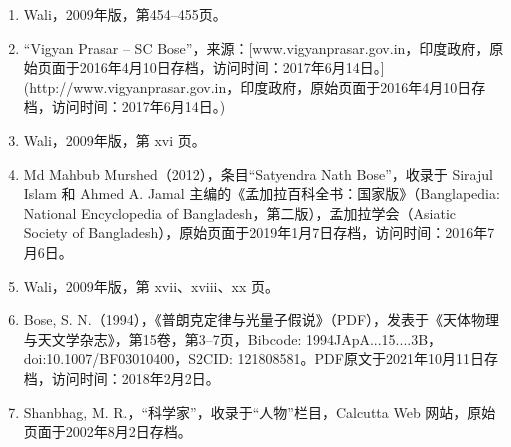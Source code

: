 \begin{enumerate}
\item Wali，2009年版，第454–455页。
\item “Vigyan Prasar – SC Bose”，来源：[www.vigyanprasar.gov.in，印度政府，原始页面于2016年4月10日存档，访问时间：2017年6月14日。](http://www.vigyanprasar.gov.in，印度政府，原始页面于2016年4月10日存档，访问时间：2017年6月14日。)
\item Wali，2009年版，第 xvi 页。
\item Md Mahbub Murshed（2012），条目“Satyendra Nath Bose”，收录于 Sirajul Islam 和 Ahmed A. Jamal 主编的《孟加拉百科全书：国家版》（Banglapedia: National Encyclopedia of Bangladesh，第二版），孟加拉学会（Asiatic Society of Bangladesh），原始页面于2019年1月7日存档，访问时间：2016年7月6日。
\item Wali，2009年版，第 xvii、xviii、xx 页。
\item Bose, S. N.（1994），《普朗克定律与光量子假说》（PDF），发表于《天体物理与天文学杂志》，第15卷，第3–7页，Bibcode: 1994JApA...15....3B，doi:10.1007/BF03010400，S2CID: 121808581。PDF原文于2021年10月11日存档，访问时间：2018年2月2日。
\item Shanbhag, M. R.，“科学家”，收录于“人物”栏目，Calcutta Web 网站，原始页面于2002年8月2日存档。

\end{enumerate}